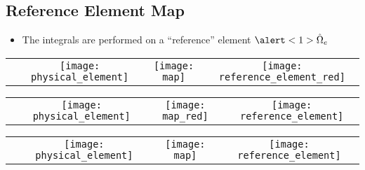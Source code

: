 \subsection*{Reference Element Map}


\begin{frame}[t]
  \begin{block}{}
    \begin{itemize}    
  \item{
    The integrals are performed on a ``reference'' element $\alert<1>{\hat{\Omega}_e}$
    }
  \end{itemize}
  \end{block}
    {
    \begin{tabular}{p{}ccc} \\
      &
      \texttt{[image: physical\_element]}&
      \texttt{[image: map]}&
      \texttt{[image: reference\_element\_red]}
    \end{tabular}
    }
    {
    \begin{tabular}{p{}ccc} \\ 
      &
      \texttt{[image: physical\_element]}&
      \texttt{[image: map\_red]}&
      \texttt{[image: reference\_element]}
    \end{tabular}
    }
    {
    \begin{tabular}{p{}ccc} \\ 
      &
      \texttt{[image: physical\_element]}&
      \texttt{[image: map]}&
      \texttt{[image: reference\_element]}
    \end{tabular}
    }
    



\end{frame}
